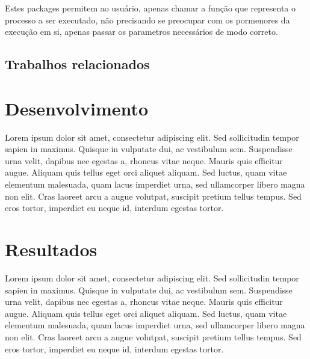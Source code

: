 \documentclass[
	12pt,				%
	openright,			%
	oneside,			%
	a4paper,			%
	english,			%
	brazil				%
	]{abntex2}
\begin{document}
Estes packages permitem ao usuário, apenas chamar a função que representa o processo a ser executado, não precisando se preocupar com
os pormenores da execução em si, apenas passar os parametros necessários de modo correto.

\section{Trabalhos relacionados}



 \chapter{Desenvolvimento}

 Lorem ipsum dolor sit amet, consectetur adipiscing elit. Sed sollicitudin tempor sapien in maximus. Quisque in vulputate dui, ac vestibulum sem. Suspendisse urna velit, dapibus nec egestas a, rhoncus vitae neque. Mauris quis efficitur augue. Aliquam quis tellus eget orci aliquet aliquam. Sed luctus, quam vitae elementum malesuada, quam lacus imperdiet urna, sed ullamcorper libero magna non elit. Cras laoreet arcu a augue volutpat, suscipit pretium tellus tempus. Sed eros tortor, imperdiet eu neque id, interdum egestas tortor.

 \chapter{Resultados}

 Lorem ipsum dolor sit amet, consectetur adipiscing elit. Sed sollicitudin tempor sapien in maximus. Quisque in vulputate dui, ac vestibulum sem. Suspendisse urna velit, dapibus nec egestas a, rhoncus vitae neque. Mauris quis efficitur augue. Aliquam quis tellus eget orci aliquet aliquam. Sed luctus, quam vitae elementum malesuada, quam lacus imperdiet urna, sed ullamcorper libero magna non elit. Cras laoreet arcu a augue volutpat, suscipit pretium tellus tempus. Sed eros tortor, imperdiet eu neque id, interdum egestas tortor.

\end{document}
